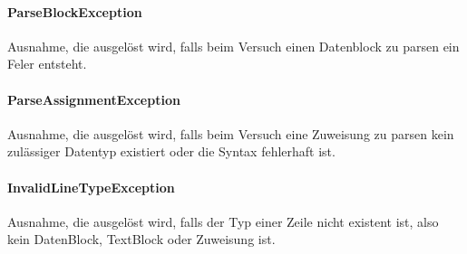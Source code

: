 \documentclass[parskip=full]{scrartcl}
\begin{document}
\paragraph{ParseBlockException}
Ausnahme, die ausgelöst wird, falls beim Versuch einen Datenblock zu parsen ein Feler entsteht.
\paragraph{ParseAssignmentException}
Ausnahme, die ausgelöst wird, falls beim Versuch eine Zuweisung zu parsen kein zulässiger Datentyp existiert oder die Syntax fehlerhaft ist.
\paragraph{InvalidLineTypeException}
Ausnahme, die ausgelöst wird, falls der Typ einer Zeile nicht existent ist, also kein DatenBlock, TextBlock oder Zuweisung ist.

\newpage
\end{document}
